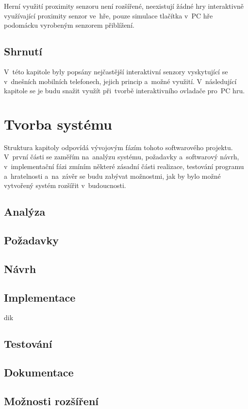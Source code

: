 \documentclass[thesis=B,czech,hidelinks]{FITthesis}[2012/06/26] %
\begin{document}
Herní využití proximity senzoru není rozšířené, neexistují žádné hry interaktivně využívající proximity senzor ve~hře, pouze simulace tlačítka v~PC hře podomácku vyrobeným senzorem přiblížení. \cite{proximitygame}

\section{Shrnutí}

V~této kapitole byly popsány nejčastější interaktivní senzory vyskytující se v~dnešních mobilních telefonech, jejich princip a~možné využití. V~následující kapitole se je budu snažit využít při~tvorbě interaktivního ovladače pro~PC hru. 

\chapter{Tvorba systému}
\label{chapter:implementation}

Struktura kapitoly odpovídá vývojovým fázím tohoto softwarového projektu. V~první části se zaměřím na~analýzu systému, požadavky a~softwarový návrh, v~implementační fázi zmíním některé zásadní části realizace, testování programu a~hratelnosti a~na~závěr se budu zabývat možnostmi, jak by bylo možné vytvořený systém rozšířit v~budoucnosti.

\section{Analýza}
\section{Požadavky}
\section{Návrh}
\section{Implementace}dik
\section{Testování}
\section{Dokumentace}
\section{Možnosti rozšíření}
\end{document}
